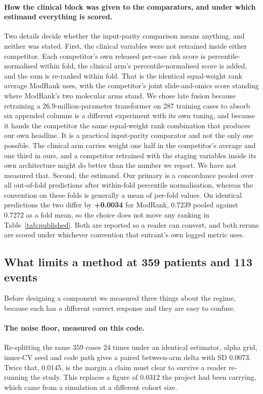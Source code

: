\documentclass[unnumsec,webpdf,contemporary,large]{oup-authoring-template}
\begin{document}
\paragraph{How the clinical block was given to the comparators, and under which estimand
everything is scored.} Two details decide whether the input-parity comparison means anything, and
neither was stated. First, the clinical variables were not retrained inside either competitor. Each
competitor's own released per-case risk score is percentile-normalised within fold, the clinical
arm's percentile-normalised score is added, and the sum is re-ranked within fold. That is the
identical equal-weight rank average ModRank uses, with the competitor's joint slide-and-omics score
standing where ModRank's two molecular arms stand. We chose late fusion because retraining a
26.9-million-parameter transformer on 287 training cases to absorb six appended columns is a
different experiment with its own tuning, and because it hands the competitor the same
equal-weight rank combination that produces our own headline. It is a practical input-parity
comparator and not the only one possible. The clinical arm carries weight one half in the
competitor's average and one third in ours, and a competitor retrained with the staging variables
inside its own architecture might do better than the number we report. We have not measured
that. Second, the estimand. Our primary is a concordance pooled over all out-of-fold predictions
after within-fold percentile normalisation, whereas the convention on these folds is generally a
mean of per-fold values. On identical predictions the two differ by \textbf{+0.0034} for ModRank,
0.7239 pooled against 0.7272 as a fold mean, so the choice does not move any ranking in
Table~\ref{tab:published}. Both are reported so a reader can convert, and both reruns are scored
under whichever convention that entrant's own logged metric uses.

\subsection{What limits a method at 359 patients and 113 events}

Before designing a component we measured three things about the regime, because each has a
different correct response and they are easy to confuse.

\paragraph{The noise floor, measured on this code.} Re-splitting the same 359 cases 24 times under
an identical estimator, alpha grid, inner-CV seed and code path gives a paired between-arm delta
with SD 0.0073. Twice that, 0.0145, is the margin a claim must clear to survive a
reader re-running the study. This replaces a figure of 0.0312 the project had been carrying, which
came from a simulation at a different cohort size.
\end{document}
